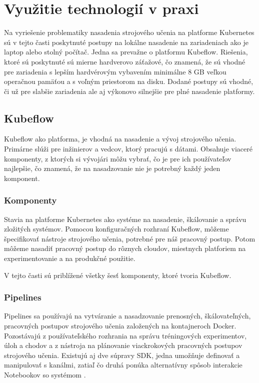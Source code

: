 
\chapter{Využitie technologií v praxi}
\label{methodology}

Na vyriešenie problematiky nasadenia strojového učenia na platforme Kubernetes sú v tejto časti poskytnuté postupy na lokálne nasadenie na zariadeniach ako je laptop alebo stolný počítač. Jedna sa prevažne o platformu Kubeflow. Riešenia, ktoré sú poskytnuté sú mierne hardverovo záťažové, čo znamená, že sú vhodné pre zariadenia s lepším hardvérovým vybavením minimálne 8 GB veľkou operačnou pamäťou a s voľným priestorom na disku. Dodané postupy sú vhodné, či už pre slabšie zariadenia ale aj výkonovo silnejšie pre plné nasadenie platformy.

\section{Kubeflow}
Kubeflow ako platforma, je vhodná na nasadenie a vývoj strojového učenia. Primárne slúži pre inžinierov a vedcov, ktorý pracujú s dátami. Obsahuje viaceré komponenty, z ktorých si vývojári môžu vybrať, čo je pre ich používateľov najlepšie, čo znamená, že na nasadzovanie nie je potrebný každý jeden komponent.

\subsection{Komponenty}

Stavia na platforme Kubernetes ako systéme na nasadenie, škálovanie a správu zložitých systémov. Pomocou konfiguračných rozhraní Kubeflow, môžeme špecifikovať nástroje strojového učenia, potrebné pre náš pracovný postup. Potom môžeme nasadiť pracovný postup do rôznych cloudov, miestnych platforiem na experimentovanie a na produkčné použitie.

V tejto časti sú priblížené všetky šesť komponenty, ktoré tvoria Kubeflow.


\subsection*{Pipelines}

Pipelines sa používajú na vytváranie a nasadzovanie prenosných, škálovateľných, pracovných postupov strojového učenia založených na kontajneroch Docker. Pozostávajú z používateľského rozhrania na správu tréningových experimentov, úloh a chodov a z nástroja na plánovanie viackrokových pracovných postupov strojového učenia. Existujú aj dve súpravy SDK, jedna umožňuje definovať a manipulovať s kanálmi, zatiaľ čo druhá ponúka alternatívny spôsob interakcie Notebookov so systémom \cite{pipe}.

